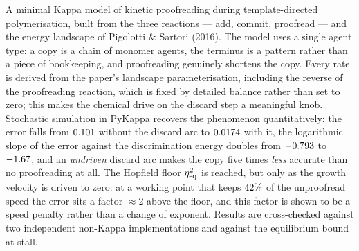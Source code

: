 A minimal Kappa model of kinetic proofreading during template-directed polymerisation,
built from the three reactions --- add, commit, proofread --- and the energy landscape of
Pigolotti \& Sartori (2016).  The model uses a single agent type: a copy is a chain of
monomer agents, the terminus is a pattern rather than a piece of bookkeeping, and
proofreading genuinely shortens the copy.  Every rate is derived from the paper's
landscape parameterisation, including the reverse of the proofreading reaction, which is
fixed by detailed balance rather than set to zero; this makes the chemical drive on the
discard step a meaningful knob.  Stochastic simulation in PyKappa recovers the
phenomenon quantitatively: the error falls from $0.101$ without the discard arc to
$0.0174$ with it, the logarithmic slope of the error against the discrimination energy
doubles from $-0.793$ to $-1.67$, and an \emph{undriven} discard arc makes the copy
five times \emph{less} accurate than no proofreading at all.  The Hopfield floor
$\eta_{\rm eq}^2$ is reached, but only as the growth velocity is driven to zero: at a
working point that keeps $42\%$ of the unproofread speed the error sits a factor
$\approx2$ above the floor, and this factor is shown to be a speed penalty rather than a
change of exponent.  Results are
cross-checked against two independent non-Kappa implementations and against the
equilibrium bound at stall.
